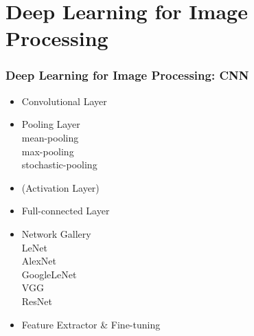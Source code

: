 
\ifx\allfiles\undefined

\fi
\section{Deep Learning for Image Processing}
\begin{frame}
\frametitle{Deep Learning for Image Processing: CNN}
	\small
	\begin{itemize}
		\item Convolutional Layer
		\item Pooling Layer
			\\\hspace{1cm} mean-pooling
			\\\hspace{1cm} max-pooling
			\\\hspace{1cm} stochastic-pooling
		\item (Activation Layer)
		\item Full-connected Layer
		\item Network Gallery
			\\\hspace{1cm} LeNet
			\\\hspace{1cm} AlexNet
			\\\hspace{1cm} GoogleLeNet
			\\\hspace{1cm} VGG
			\\\hspace{1cm} ResNet
		\item Feature Extractor \& Fine-tuning
	\end{itemize}
\end{frame}
